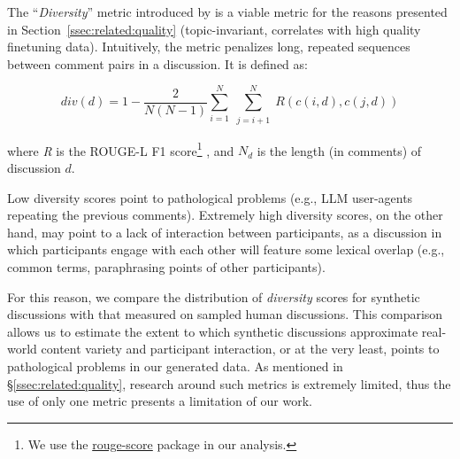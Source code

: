 The “\textit{Diversity}” metric introduced by \citet{ulmer2024} is a viable metric for the reasons presented in Section~\ref{ssec:related:quality} (topic-invariant, correlates with high quality finetuning data). Intuitively, the metric penalizes long, repeated sequences between comment pairs in a discussion. It is defined as:

\small
\begin{equation}
\label{eq:variety}
    \textit{div}(d) = 1 - \frac{2}{N(N-1)}
\sum_{i=1}^N \sum_{\substack{j=i+1}}^N R(c(i,d), c(j,d))
\end{equation}
\normalsize

\noindent where \textit{R} is the ROUGE-L F1 score\footnote{We use the \href{https://pypi.org/project/rouge-score}{rouge-score} package in our analysis.} \cite{lin-2004-rouge}, and $N_d$ is the length (in comments) of discussion $d$.

Low diversity scores point to pathological problems (e.g., \ac{LLM} user-agents repeating the previous comments). Extremely high diversity scores, on the other hand, may point to a lack of interaction between participants, as a discussion in which participants engage with each other will feature some lexical overlap (e.g., common terms, paraphrasing points of other participants).%

For this reason, we compare the distribution of \textit{diversity} scores for synthetic discussions with that measured on sampled human discussions. This comparison allows us to estimate the extent to which synthetic discussions approximate real-world content variety and participant interaction, or at the very least, points to pathological problems in our generated data. As mentioned in \S\ref{ssec:related:quality}, research around such metrics is extremely limited, thus the use of only one metric presents a limitation of our work.